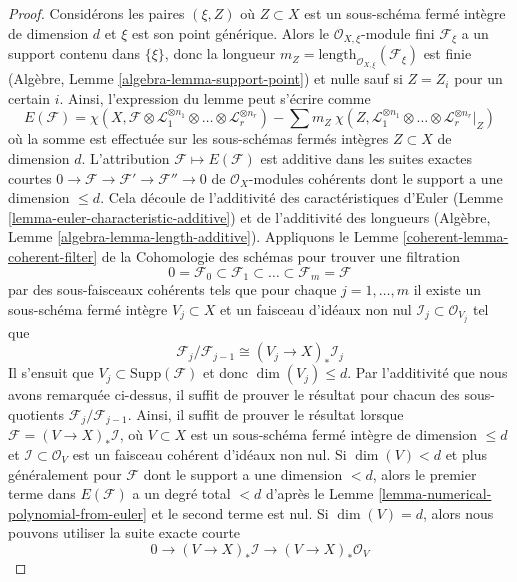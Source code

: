 \begin{proof}
Considérons les paires $(\xi , Z)$ où $Z \subset X$ est un
sous-schéma fermé intègre de dimension $d$ et $\xi$ est son
point générique. Alors le $\mathcal{O}_{X, \xi}$-module
fini $\mathcal{F}_\xi$ a un support contenu dans $\{\xi\}$,
donc la longueur $m_Z = \text{length}_{\mathcal{O}_{X,
\xi}}(\mathcal{F}_\xi)$ est finie (Algèbre, Lemme
\ref{algebra-lemma-support-point}) et nulle sauf si $Z = Z_i$ pour
un certain $i$. Ainsi, l'expression du lemme peut s'écrire comme
$$
E(\mathcal{F}) =
\chi(X, \mathcal{F} \otimes \mathcal{L}_1^{\otimes n_1} \otimes \ldots \otimes
\mathcal{L}_r^{\otimes n_r}) -
\sum\nolimits
m_Z\ \chi(Z, \mathcal{L}_1^{\otimes n_1} \otimes \ldots \otimes
\mathcal{L}_r^{\otimes n_r}|_Z)
$$
où la somme est effectuée sur les sous-schémas fermés
intègres $Z \subset X$ de dimension $d$. L'attribution
$\mathcal{F} \mapsto E(\mathcal{F})$ est additive dans les
suites exactes courtes $0 \to \mathcal{F} \to \mathcal{F}'
\to \mathcal{F}'' \to 0$ de $\mathcal{O}_X$-modules
cohérents dont le support a une dimension $\leq d$. Cela
découle de l'additivité des caractéristiques d'Euler (Lemme
\ref{lemma-euler-characteristic-additive}) et de l'additivité
des longueurs (Algèbre, Lemme
\ref{algebra-lemma-length-additive}). Appliquons le Lemme
\ref{coherent-lemma-coherent-filter} de la Cohomologie des schémas pour trouver une filtration
$$
0 = \mathcal{F}_0 \subset \mathcal{F}_1 \subset
\ldots \subset \mathcal{F}_m = \mathcal{F}
$$
par des sous-faisceaux cohérents tels que pour
chaque $j = 1, \ldots, m$ il existe un sous-schéma
fermé intègre $V_j \subset X$ et un faisceau d'idéaux
non nul $\mathcal{I}_j \subset \mathcal{O}_{V_j}$ tel que
$$
\mathcal{F}_j/\mathcal{F}_{j - 1}
\cong (V_j \to X)_* \mathcal{I}_j
$$
Il s'ensuit que $V_j \subset \text{Supp}(\mathcal{F})$ et
donc $\dim(V_j) \leq d$. Par l'additivité que nous avons
remarquée ci-dessus, il suffit de prouver le résultat
pour chacun des sous-quotients
$\mathcal{F}_j/\mathcal{F}_{j - 1}$. Ainsi, il suffit de
prouver le résultat lorsque $\mathcal{F} = (V \to
X)_*\mathcal{I}$, où $V \subset X$ est un sous-schéma fermé
intègre de dimension $\leq d$ et $\mathcal{I} \subset
\mathcal{O}_V$ est un faisceau cohérent d'idéaux non nul. Si
$\dim(V) < d$ et plus généralement pour $\mathcal{F}$ dont le
support a une dimension $< d$, alors le premier terme dans
$E(\mathcal{F})$ a un degré total $< d$ d'après le Lemme
\ref{lemma-numerical-polynomial-from-euler} et le second terme est
nul. Si $\dim(V) = d$, alors nous pouvons utiliser la suite exacte courte
$$
0 \to (V \to X)_*\mathcal{I} \to (V \to X)_*\mathcal{O}_V
$$
\end{proof}
